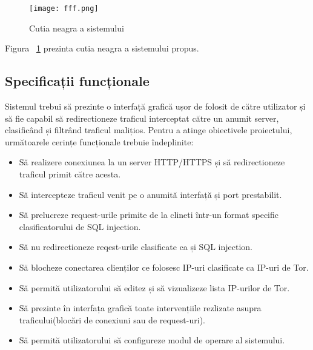 \begin{figure}[h]
	\centering
	\texttt{[image: fff.png]}
	\caption{Cutia neagra a sistemului}
	\label{fig:black-box}
\end{figure}

Figura ~\ref{fig:black-box} prezinta cutia neagra a sistemului propus. \\

 \subsection{Specificații funcționale}

Sistemul trebui să prezinte o interfață grafică ușor de folosit de către utilizator și să fie capabil să redirectioneze traficul interceptat către un anumit server, clasificând și filtrând traficul malițios. Pentru a atinge obiectivele proiectului, următoarele cerințe funcționale trebuie îndeplinite: 
\begin{itemize}
  \item  Să realizere conexiunea la un server HTTP/HTTPS și să redirectioneze traficul primit către acesta. 
  \item  Să intercepteze traficul venit pe o anumită interfață și port prestabilit. 
  \item  Să prelucreze request-urile primite de la clineti într-un format specific clasificatorului de SQL injection. 
  \item  Să nu redirectioneze reqest-urile clasificate ca și SQL injection. 
  \item  Să blocheze conectarea clienților ce folosesc IP-uri clasificate ca IP-uri de Tor. 
  \item  Să permită utilizatorului să editez și să vizualizeze lista IP-urilor de Tor. 
  \item  Să prezinte în interfața grafică toate intervențiile rezlizate asupra traficului(blocări de conexiuni sau de request-uri). 
  \item  Să permită utilizatorului să configureze modul de operare al sistemului. 
\end{itemize}


